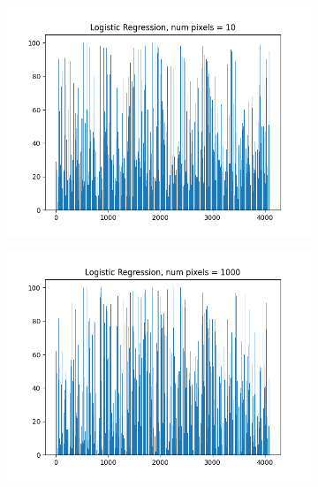 \documentclass{article}
\begin{document}
\begin{figure}[H]
\begin{subfigure}{.33\textwidth}
  \centering
  \includegraphics[width=1\linewidth]{2d/Logistic Regression, 10.png}  
  
  \label{fig:sub-first}
\end{subfigure}
\begin{subfigure}{.33\textwidth}
  \centering
  \includegraphics[width=1\linewidth]{2d/Logistic Regression, 1000.png}  
  

\end{subfigure}
\end{figure}
\end{document}
